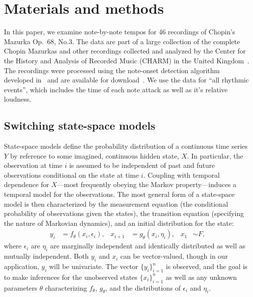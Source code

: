 \documentclass[12pt]{article}
\begin{document}
\section{Materials and methods}
\label{sec:materials-methods}





In this paper, we examine note-by-note tempos for 46 recordings of
Chopin's Mazurka Op.\ 68, No.3. The data are part of a large
collection of the complete Chopin Mazurkas and other recordings
collected and analyzed by the Center for the History and Analysis of
Recorded Music (CHARM) in the United Kingdom~\citep{CHARM-site}. The
recordings were processed using the note-onset detection algorithm
developed in~\citep{Earis2007} and are available for
download~\citep{Earis2009}. We use the data for ``all rhythmic
events'', which includes the time of each note attack as well as it's
relative loudness.

\subsection{Switching state-space models}

State-space models define the probability distribution of a continuous
time series $Y$ by reference to some imagined, continuous hidden state, $X$. In
particular, the observation at time $i$ is assumed to be
independent of past and future observations conditional on the state
at time $i$. Coupling with temporal dependence for $X$---most
frequently obeying the Markov property---induces a temporal model for
the observations.  The most general form of a state-space model is
then characterized by the 
measurement equation (the conditional probability of observations
given the states),
the transition equation (specifying the nature of Markovian
dynamics), and an initial distribution for the state: 
\begin{equation}
\begin{aligned}
  y_i &= f_\theta(x_i,\epsilon_i), &
  x_{i+1} &= g_\theta(x_i,\eta_i), &
  x_1 &\sim F,
\end{aligned}
\label{eq:ssmod}
\end{equation}
where $\epsilon_i$ are $\eta_i$ are marginally independent and
identically distributed  as well as mutually independent. Both
$y_i$ and $x_i$ can be vector-valued, though in our
application, $y_i$ will be univariate. The
vector $\{y_i\}_{i=1}^n$ is observed, and the goal is to make
inferences for the unobserved states $\{x_i\}_{i=1}^n$ as well as any
unknown parameters $\theta$ characterizing $f_\theta$, $g_\theta$, and
the distributions of $\epsilon_i$ and $\eta_i$.
\end{document}
